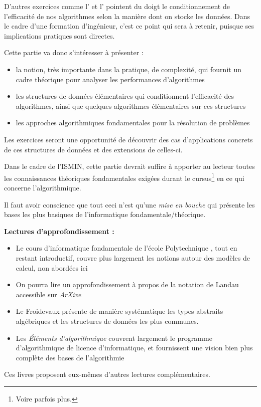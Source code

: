 \documentclass[../../main.tex]{subfiles}
\begin{document}
D'autres exercices comme l' et l' pointent du doigt le conditionnement de l'efficacité de nos algorithmes selon la manière dont on stocke les données. Dans le cadre d'une formation d'ingénieur, c'est ce point qui sera à retenir, puisque ses implications pratiques sont directes.

Cette partie va donc s'intéresser à présenter :
\begin{itemize}
	\item la notion, très importante dans la pratique, de complexité, qui fournit un cadre théorique pour analyser les performances d'algorithmes
	\item les structures de données élémentaires qui conditionnent l'efficacité des algorithmes, ainsi que quelques algorithmes élémentaires sur ces structures
	\item les approches algorithmiques fondamentales pour la résolution de problèmes
\end{itemize}
Les exercices seront une opportunité de découvrir des cas d'applications concrets de ces structures de données et des extensions de celles-ci.

Dans le cadre de l'ISMIN, cette partie devrait suffire à apporter au lecteur toutes les connaissances théoriques fondamentales exigées durant le cursus\footnote{Voire parfois plus.} en ce qui concerne l'algorithmique.

Il faut avoir conscience que tout ceci n'est qu'une \textit{mise en bouche} qui présente les bases les plus basiques de l'informatique fondamentale/théorique.

\textbf{Lectures d'approfondissement :}
\begin{itemize}
	\item Le cours d'informatique fondamentale de l'école Polytechnique \cite{XFI}, tout en restant introductif, couvre plus largement les notions autour des modèles de calcul, non abordées ici
	\item On pourra lire un approfondissement à propos de la notation de Landau \cite{ONotation} accessible sur \textit{ArXive}
	\item Le Froidevaux \cite{Froidevaux} présente de manière systématique les types abstraits algébriques et les structures de données les plus communes.
	\item Les \textit{Éléments d'algorithmique} \cite{EltAlgorithmie} couvrent largement le programme d'algorithmique de licence d'informatique, et fournissent une vision bien plus complète des bases de l'algorithmie
\end{itemize}
Ces livres proposent eux-mêmes d'autres lectures complémentaires.
\end{document}
